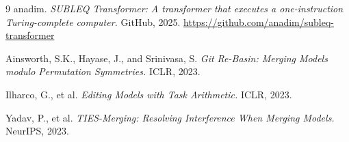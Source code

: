 \documentclass[11pt,a4paper]{article}
\begin{document}
\begin{thebibliography}{9}
anadim. \textit{SUBLEQ Transformer: A transformer that executes a one-instruction Turing-complete computer.} GitHub, 2025. \url{https://github.com/anadim/subleq-transformer}

Ainsworth, S.K., Hayase, J., and Srinivasa, S. \textit{Git Re-Basin: Merging Models modulo Permutation Symmetries.} ICLR, 2023.

Ilharco, G., et al. \textit{Editing Models with Task Arithmetic.} ICLR, 2023.

Yadav, P., et al. \textit{TIES-Merging: Resolving Interference When Merging Models.} NeurIPS, 2023.
\end{thebibliography}
\end{document}
